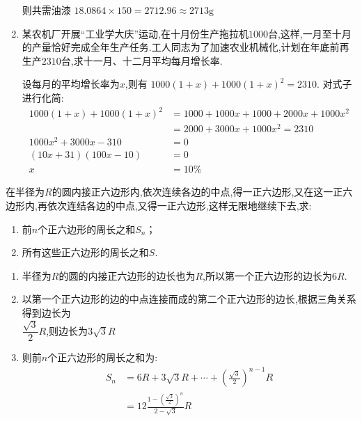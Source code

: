 \begin{questions}
\begin{enumerate}[label=(\arabic*)]
\begin{solution}
			      则共需油漆 \( 18.0864 \times 150 = 2712.96 \approx 2713 \text{g} \)
		      \end{solution}
		\item
		      某农机厂开展\enquote{工业学大庆}运动,在十月份生产拖拉机$1000$台,这样,一月至十月的产量恰好完成全年生产任务.工人同志为了加速农业机械化,计划在年底前再生产$2310$台,求十一月、十二月平均每月增长率.

		      \begin{solution}
			      设每月的平均增长率为$x$,则有 	\( 1000(1+x) + 1000(1+x)^2 = 2310 \).
			      对式子进行化简:
			      \begin{align*}
				      1000(1+x) + 1000(1+x)^2 & = 1000 + 1000x + 1000 + 2000x + 1000x^2 \\
				                              & = 2000 + 3000x + 1000x^2 = 2310         \\
				      1000x^2 +3000x - 310    & = 0                                     \\
				      (10x + 31)(100x - 10)   & = 0                                     \\
				      x                       & = 10\%
			      \end{align*}
		      \end{solution}
	\end{enumerate}
	\question 在半径为$R$的圆内接正六边形内,依次连续各边的中点,得一正六边形,又在这一正六边形内,再依次连结各边的中点,又得一正六边形,这样无限地继续下去,求:
	\begin{enumerate}[label=(\arabic*)]
		\item 前$n$个正六边形的周长之和$S_n$；
		\item 所有这些正六边形的周长之和$S$.
	\end{enumerate}
	\begin{solution}
		\begin{enumerate}[label=\zhnum{*}、]
			\item 半径为$R$的圆的内接正六边形的边长也为$R$,所以第一个正六边形的边长为$6R$.
			\item
			      以第一个正六边形的边的中点连接而成的第二个正六边形的边长,根据三角关系得到边长为\\$\dfrac{\sqrt{3}}{2}R$,则边长为$3\sqrt{3}R$
			\item 则前$n$个正六边形的周长之和为:
			      \begin{align*}
				      S_n & = 6R + 3\sqrt{3}R + \cdots +  (\frac{\sqrt{3}}{2})^{n-1}R \\
				          & = 12\frac{1-(\frac{\sqrt{3}}{2})^n}{2-\sqrt{3}}R          \\

\end{align*}
\end{enumerate}
\end{solution}
\end{questions}
